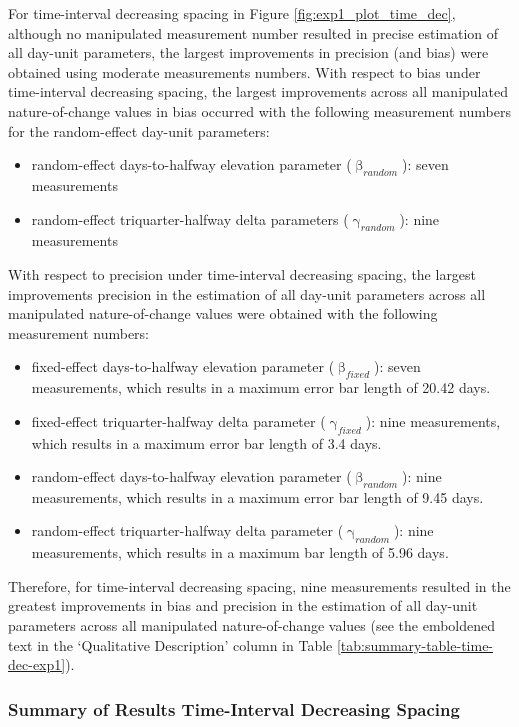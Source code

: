 \documentclass[
12pt, %
twoside,
english]{guelphthesis}
\begin{document}
For time-interval decreasing spacing in Figure \ref{fig:exp1_plot_time_dec}, although no manipulated measurement number resulted in precise estimation of all day-unit parameters, the largest improvements in precision (and bias) were obtained using moderate measurements numbers. With respect to bias under time-interval decreasing spacing, the largest improvements across all manipulated nature-of-change values in bias occurred with the following measurement numbers for the random-effect day-unit parameters:
\begin{itemize}
\tightlist
\item
  random-effect days-to-halfway elevation parameter (\(\upbeta_{random}\)): seven measurements
\item
  random-effect triquarter-halfway delta parameters (\(\upgamma_{random}\)): nine measurements
\end{itemize}
\noindent With respect to precision under time-interval decreasing spacing, the largest improvements precision in the estimation of all day-unit parameters across all manipulated nature-of-change values were obtained with the following measurement numbers:
\begin{itemize}
\tightlist
\item
  fixed-effect days-to-halfway elevation parameter (\(\upbeta_{fixed}\)): seven measurements, which results in a maximum error bar length of 20.42 days.
\item
  fixed-effect triquarter-halfway delta parameter (\(\upgamma_{fixed}\)): nine measurements, which results in a maximum error bar length of 3.4 days.
\item
  random-effect days-to-halfway elevation parameter (\(\upbeta_{random}\)): nine measurements, which results in a maximum error bar length of 9.45 days.
\item
  random-effect triquarter-halfway delta parameter (\(\upgamma_{random}\)): nine measurements, which results in a maximum bar length of 5.96 days.
\end{itemize}
\noindent Therefore, for time-interval decreasing spacing, nine measurements resulted in the greatest improvements in bias and precision in the estimation of all day-unit parameters across all manipulated nature-of-change values (see the emboldened text in the `Qualitative Description' column in Table \ref{tab:summary-table-time-dec-exp1}).

\hypertarget{summary-of-results-time-interval-decreasing-spacing}{%
\subsubsection{Summary of Results Time-Interval Decreasing Spacing}\label{summary-of-results-time-interval-decreasing-spacing}}
\end{document}
